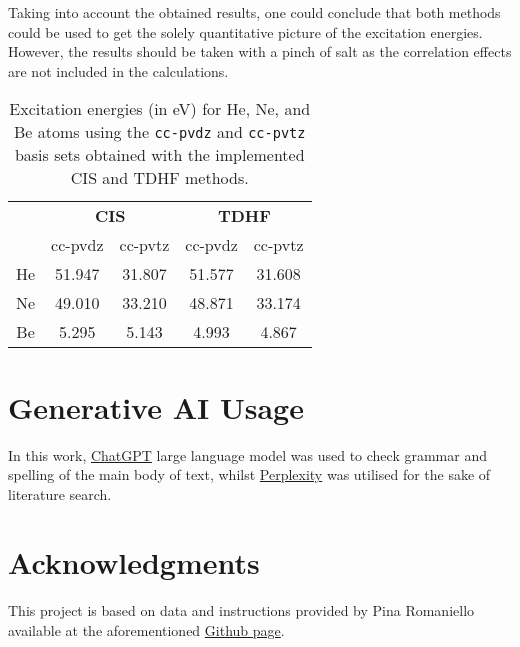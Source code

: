 \documentclass[12pt]{article}
\begin{document}
Taking into account the obtained results, one could conclude that both methods could be used to get the solely quantitative picture of the excitation energies. However, the results should be taken with a pinch of salt as the correlation effects are not included in the calculations.

\begin{table}[h!]
    \centering
    \renewcommand{\arraystretch}{1.2}
    \setlength{\tabcolsep}{7pt}
    \begin{tabular}{ccccc}
    \toprule
    & \multicolumn{2}{c}{\textbf{CIS}} & \multicolumn{2}{c}{\textbf{TDHF}} \\ 
    \cmidrule(lr){2-3} \cmidrule(lr){4-5}
    & cc-pvdz    & cc-pvtz    & cc-pvdz     & cc-pvtz    \\ 
    \midrule
    He                   & 51.947     & 31.807     & 51.577      & 31.608     \\
    Ne                   & 49.010     & 33.210     & 48.871      & 33.174     \\
    Be                   & 5.295      & 5.143      & 4.993       & 4.867      \\
    \bottomrule
    \end{tabular}
    \caption{Excitation energies (in eV) for He, Ne, and Be atoms using the \texttt{cc-pvdz} and \texttt{cc-pvtz} basis sets obtained with the implemented CIS and TDHF methods.}
    \label{tab:excitation_energies}
\end{table}

\section*{Generative AI Usage}
In this work, \href{https://chatgpt.com}{ChatGPT} large language model was used to check grammar and spelling of the main body of text, whilst \href{https://www.perplexity.ai}{Perplexity} was utilised for the sake of literature search.

\section*{Acknowledgments}
This project is based on data and instructions provided by Pina Romaniello available at the aforementioned \href{https://github.com/almakhmudov/LTTC-Homework--CIS-TDHF}{Github page}.


\end{document}
